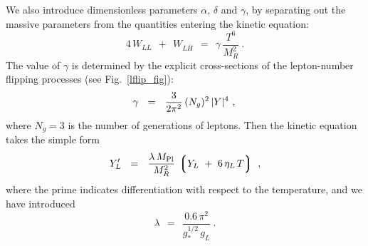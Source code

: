 \documentclass[12pt]{revtex4}
\newcommand{\lgr}{\left\lgroup}
\newcommand{\rgr}{\right\rgroup}
\newcommand{\Mpl}{M_{\rm Pl}}
\newcommand{\ov}{\overline}
\begin{document}
	We also introduce dimensionless parameters $ \alpha $, 
	$ \delta $ and $ \gamma $, by separating out the massive
	parameters from the quantities entering the kinetic equation:
\begin{equation*}
	4\, W_{LL} ~~+~~ W_{L\ov{H}} ~~=~~ 
		 \gamma\, \frac{T^6}{M_R^2}~.
\end{equation*}
	The value of $ \gamma $ is determined by the explicit 
	cross-sections of the lepton-number flipping processes
	(see Fig.~\ref{lflip_fig}):
\[
	\gamma  ~~=~~ \frac{3}{2\pi^2}\, (N_g)^2\, |Y|^4~, \\
\]
	where $ N_g = 3 $ is the number of generations of leptons.
	Then the kinetic equation takes the simple form
\begin{equation}
\label{btz_simple}
	Y_L' ~~=~~ \frac{\lambda\,\Mpl}{M_R^2} \,
			\lgr Y_L ~+~ 6\,\eta_L\, T \rgr~,
\end{equation}
	where the prime indicates differentiation with respect to
	the temperature,
	and we have introduced
\[
	\lambda ~~=~~ \frac{0.6\, \pi^2}
    		         {g_*^{1/2}\, g_L}~.
\]
	
\end{document}
